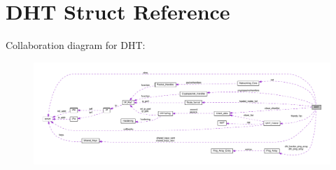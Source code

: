 \hypertarget{struct_d_h_t}{\section{D\+H\+T Struct Reference}
\label{struct_d_h_t}
}


Collaboration diagram for D\+H\+T\+:
\nopagebreak
\begin{figure}[H]
\begin{center}
\leavevmode
\includegraphics[width=350pt]{struct_d_h_t__coll__graph}
\end{center}
\end{figure}
